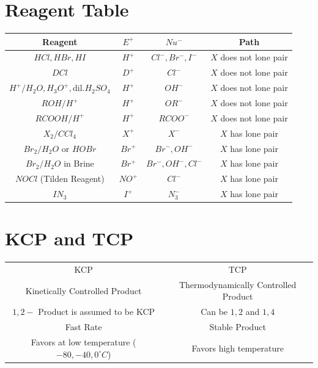 \documentclass{article}
\begin{document}
\section{Reagent Table}

\begin{tabular}{|c| c| c| c| }
    \hline
    Reagent                                         & $E^+$  & $Nu^-$             & Path                   \\[1mm]
    \hline
    $HCl, HBr, HI$                                  & $H^+$  & $Cl^-, Br^-, I^-$  & $X$ does not lone pair \\
    $DCl$                                           & $D^+$  & $Cl^-$             & $X$ does not lone pair \\
    $H^+/H_{2}O, H_{3}O^+, \text{dil.} H_{2}SO_{4}$ & $H^+$  & $OH^-$             & $X$ does not lone pair \\
    $ROH/H^+$                                       & $H^+$  & $OR^-$             & $X$ does not lone pair \\
    $RCOOH/H^+$                                     & $H^+$  & $RCOO^-$           & $X$ does not lone pair \\
    \hline
    $X_{2}/CCl_{4}$                                 & $X^+$  & $X^-$              & $X$ has lone pair      \\
    $Br_{2}/H_{2}O$ or $HOBr$                       & $Br^+$ & $Br^-, OH^-$       & $X$ has lone pair      \\
    $Br_{2}/H_{2}O$ in Brine                        & $Br^+$ & $Br^-, OH^-, Cl^-$ & $X$ has lone pair      \\
    $NOCl$ (Tilden Reagent)                         & $NO^+$ & $Cl^-$             & $X$ has lone pair      \\
    $IN_{3}$                                        & $I^+$  & $N_{3}^-$          & $X$ has lone pair      \\
    \hline
\end{tabular}

\section{KCP and TCP}
\begin{center}
    \begin{tabular}{c | c}
        KCP                                                 & TCP                                  \\
        Kinetically Controlled Product                      & Thermodynamically Controlled Product \\
        $1,2-$ Product is assumed to be KCP                 & Can be $1,2 $ and $1,4$              \\
        Fast Rate                                           & Stable Product                       \\
        Favors at low temperature ($-80, -40, 0 ^ \circ C$) & Favors high temperature
    \end{tabular}
\end{center}
\end{document}
